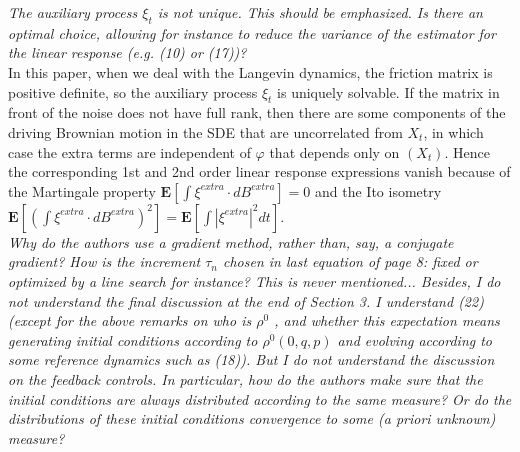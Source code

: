 \documentclass[]{revtex4-1}
\begin{document}

\emph{
  The auxiliary process $\xi_t$ is not unique. This should be emphasized. Is there an optimal
choice, allowing for instance to reduce the variance of the estimator for the linear response
(e.g. (10) or (17))?
}\\

In this paper, when we deal with  the Langevin dynamics, 
the friction
matrix is positive definite, so the auxiliary process $\xi_t$ is uniquely
solvable.
If the matrix in front of the noise does not have full rank, then
there are some components of the driving Brownian motion in the SDE
that are uncorrelated from $X_t$, in which case the extra terms are
independent of $\varphi$ that depends only on $(X_t)$. Hence the
corresponding 1st and 2nd order linear response expressions vanish
because of the Martingale property $\textbf{E}[\int \xi^{extra}\cdot dB^{extra}]=0$
and the Ito isometry $\textbf{E}[(\int \xi^{extra}\cdot dB^{extra})^2]= \textbf{E} [\int
|\xi^{extra}|^2dt]$.
\\

\emph{
Why do the authors use a gradient method, rather than, say, a
conjugate gradient? How is the increment $\tau_n$ chosen in last equation of
page 8: fixed or optimized by a line search for instance? This is
never mentioned... Besides, I do not understand the final discussion
at the end of Section 3. I understand (22) (except for the above
remarks on who is $\rho^0$ , and whether this expectation means generating
initial conditions according to $\rho^0 (0, q, p)$ and evolving according to
some reference dynamics such as (18)). But I do not understand the
discussion on the feedback controls. In particular, how do the authors
make sure that the initial conditions are always distributed according
to the same measure? Or do the distributions of these initial
conditions convergence to some (a priori unknown) measure?
}\\
\end{document}
